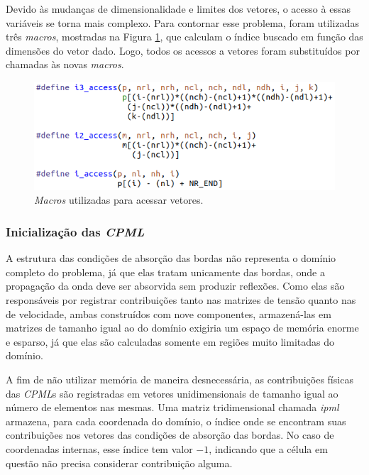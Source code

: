 \documentclass[cic,tc]{iiufrgs}
\begin{document}
Devido às mudanças de dimensionalidade e limites dos vetores, o acesso à essas variáveis se torna mais complexo. Para contornar esse problema,
foram utilizadas três \textit{macros}, mostradas na Figura \ref{fig:access}, que calculam o índice buscado em função das dimensões do vetor dado.
Logo, todos os acessos a vetores foram substituídos por chamadas às novas \textit{macros}.

\begin{figure}[!htb]
  \caption{\textit{Macros} utilizadas para acessar vetores.}
    \begin{center} 
      \includegraphics[width=34em]{access}
    \end{center}
    \label{fig:access}
\end{figure}

\subsubsection*{Inicialização das \textit{CPML}}

A estrutura das condições de absorção das bordas não representa o domínio completo do
problema, já que elas tratam unicamente das bordas, onde a propagação da onda deve ser absorvida sem produzir reflexões. Como elas são
responsáveis por registrar contribuições tanto nas matrizes de tensão quanto nas de velocidade, ambas construídos com nove componentes,
armazená-las em matrizes de tamanho igual ao do domínio exigiria um espaço de memória enorme e esparso, já que elas são calculadas somente
em regiões muito limitadas do domínio.

A fim de não utilizar memória de maneira desnecessária, as contribuições físicas das \textit{CPML}s são registradas em vetores
unidimensionais de tamanho igual ao número de elementos nas mesmas. Uma matriz tridimensional chamada \textit{ipml} armazena, para cada coordenada
do domínio, o índice onde se encontram suas contribuições nos vetores das condições de absorção das bordas. No caso de coordenadas
internas, esse índice tem valor $-1$, indicando que a célula em questão não precisa considerar contribuição alguma. 
\end{document}
